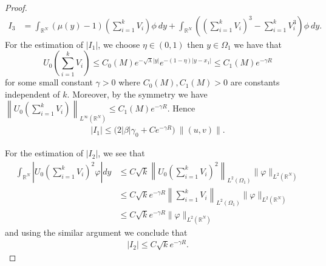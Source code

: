 \documentclass{amsart}
\theoremstyle{definition}
\theoremstyle{remark}
\numberwithin{equation}{section}
\begin{document}
\begin{proof}
\begin{align*}
 I_3 &= \int_{\mathbb{R}^N}(\mu(y)-1)\left(\sum_{i=1}^k V_{i}\right)\phi\:dy + \int_{\mathbb{R}^N} \left(\left(\sum_{i=1}^k V_{i}\right)^3 - \sum_{i=1}^k V_{i}^3\right) \phi \:dy.
\end{align*}
For the estimation of $|I_1|$, we choose $\eta \in (0,1)$ then $y\in \Omega_1$ we have that
 \begin{equation} \label{crossprod}
  U_0\left(\sum_{i=1}^k V_{i}\right) \le C_0(M)e^{-\sqrt{\lambda}|y|}e^{-(1-\eta)|y-x_1|} \le C_1(M) e^{-\gamma R}
\end{equation}
 for some small constant $\gamma>0$ where $C_0(M), C_1(M)>0$ are constants independent of $k$. Moreover, by the symmetry we have $\left\|U_0\left(\sum_{i=1}^k V_{i}\right)\right\|_{L^\infty(\mathbb{R}^N)} \le C_1(M) e^{-\gamma R}$.  Hence
 \begin{align*}
  |I_1| \le \big(2|\beta| \gamma_0 + Ce^{-\gamma R}\big) \:\|(u,v)\|.
 \end{align*}

For the estimation of $|I_2|$, we see that 
 \begin{equation}\label{I2terms}
  \begin{aligned}
  {\int_{ \mathbb{R}^N} }\left | U_0\left(\sum_{i=1}^k V_{i}\right)^2\varphi  \right| dy&\le C\sqrt{k}\left\|U_0\left(\sum_{i=1}^k V_{i}\right)^2\right\|_{L^2(\Omega_1)}\|\varphi\|_{L^2( { \mathbb{R}^N})}  \\
   &\le C\sqrt{k}e^{-\gamma R}\left\|\sum_{i=1}^k V_{i}\right\|_{L^2(\Omega_1)}\|\varphi\|_{L^2( \mathbb{R}^N)}\\
 &\le C \sqrt{k} e^{-\gamma R}\|\varphi\|_{L^2( \mathbb{R}^N)}%
 \end{aligned}
\end{equation}
 and using the similar argument we conclude that
\begin{align*}
|I_2| \le C \sqrt{k} e^{-\gamma R}.%
\end{align*}


\end{proof}
\end{document}

